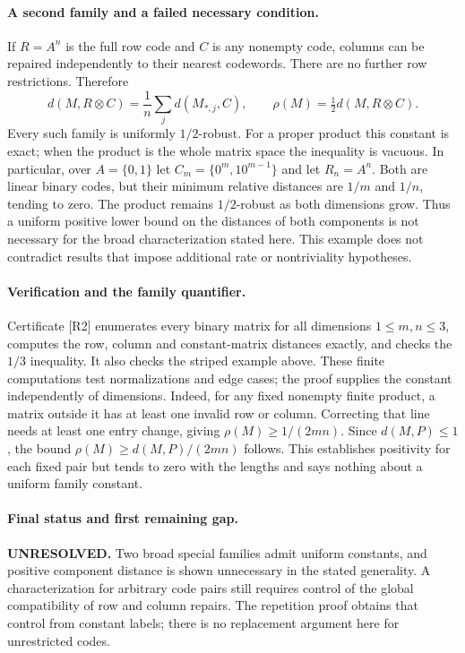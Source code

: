 \documentclass[11pt,a4paper]{article}
\begin{document}
\paragraph{A second family and a failed necessary condition.}
If $R=A^n$ is the full row code and $C$ is any nonempty code, columns
can be repaired independently to their nearest codewords. There are
no further row restrictions. Therefore
\[
 d(M,R\otimes C)=\frac1n\sum_j d(M_{*,j},C),
       \qquad \rho(M)=\tfrac12d(M,R\otimes C).
\]
Every such family is uniformly $1/2$-robust. For a proper product this
constant is exact; when the product is the whole matrix space the
inequality is vacuous. In particular, over $A=\{0,1\}$ let
$C_m=\{0^m,10^{m-1}\}$ and let $R_n=A^n$. Both are linear binary codes,
but their minimum relative distances are $1/m$ and $1/n$, tending
to zero. The product remains $1/2$-robust as both dimensions grow.
Thus a uniform positive lower bound on the distances of both components
is not necessary for the broad characterization stated here. This
example does not contradict results that impose additional rate or
nontriviality hypotheses.

\paragraph{Verification and the family quantifier.}
Certificate [R2] enumerates every binary matrix for all dimensions
$1\le m,n\le3$, computes the row, column and constant-matrix distances
exactly, and checks the $1/3$ inequality. It also checks the striped
example above. These finite computations test normalizations and edge
cases; the proof supplies the constant independently of dimensions.
Indeed, for any fixed nonempty finite product, a matrix outside it
has at least one invalid row or column. Correcting that line needs
at least one entry change, giving $\rho(M)\ge1/(2mn)$. Since
$d(M,P)\le1$, the bound $\rho(M)\ge d(M,P)/(2mn)$ follows.
This establishes positivity for each fixed pair but tends to zero
with the lengths and says nothing about a uniform family constant.

\paragraph{Final status and first remaining gap.}
\textbf{UNRESOLVED.} Two broad special families admit uniform
constants, and positive component distance is shown unnecessary in
the stated generality. A characterization for arbitrary code pairs
still requires control of the global compatibility of row and column
repairs. The repetition proof obtains that control from constant labels;
there is no replacement argument here for unrestricted codes.
\end{document}
